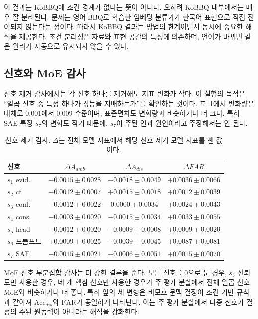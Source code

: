 \documentclass{ieeeaccess}
\newcommand{\accdis}{\mathrm{Acc}_{dis}}
\newcommand{\far}{\mathrm{FAR}}
\begin{document}
이 결과는 KoBBQ에 조건 경계가 없다는 뜻이 아니다. 오히려 KoBBQ 내부에서는 매우 잘 분리된다. 문제는 영어 BBQ로 학습한 임베딩 분류기가 한국어 표현으로 직접 전이되지 않는다는 점이다. 따라서 KoBBQ 결과는 방법의 한계이면서 동시에 중요한 해석을 제공한다. 조건 분리성은 자료와 표현 공간의 특성에 의존하며, 언어가 바뀌면 같은 원리가 자동으로 유지되지 않을 수 있다.

\subsection{신호와 MoE 감사}
신호 제거 감사에서는 각 신호 하나를 제거해도 지표 변화가 작다. 이 실험의 목적은 ``일곱 신호 중 특정 하나가 성능을 지배하는가''를 확인하는 것이다. 표~\ref{tab:signal_ko}에서 변화량은 대체로 0.001에서 0.009 수준이며, 표준편차도 변화량과 비슷하거나 더 크다. 특히 SAE 특징 $s_7$의 변화도 작기 때문에, $s_7$이 주된 인과 원인이라고 주장해서는 안 된다.

\begin{table}[t]
\caption{신호 제거 감사. $\Delta$는 전체 모델 지표에서 해당 신호 제거 모델 지표를 뺀 값이다.}
\label{tab:signal_ko}
\centering
\scriptsize
\setlength{\tabcolsep}{1.8pt}
\begin{tabular}{@{}lccc@{}}
\toprule
신호 & $\Delta A_{amb}$ & $\Delta A_{dis}$ & $\Delta FAR$ \\
\midrule
$s_1$ evid. & $-0.0015{\pm}0.0028$ & $-0.0018{\pm}0.0049$ & $+0.0036{\pm}0.0066$ \\
$s_2$ cf. & $-0.0012{\pm}0.0007$ & $+0.0015{\pm}0.0018$ & $+0.0012{\pm}0.0039$ \\
$s_3$ conf. & $-0.0012{\pm}0.0022$ & $0.0000{\pm}0.0034$ & $+0.0024{\pm}0.0043$ \\
$s_4$ cons. & $-0.0003{\pm}0.0020$ & $-0.0015{\pm}0.0034$ & $+0.0033{\pm}0.0055$ \\
$s_5$ head & $-0.0012{\pm}0.0020$ & $-0.0009{\pm}0.0008$ & $+0.0009{\pm}0.0020$ \\
$s_6$ 프롬프트 & $+0.0009{\pm}0.0025$ & $-0.0039{\pm}0.0045$ & $+0.0087{\pm}0.0081$ \\
$s_7$ SAE & $-0.0015{\pm}0.0021$ & $-0.0006{\pm}0.0051$ & $+0.0015{\pm}0.0070$ \\
\bottomrule
\end{tabular}
\end{table}

MoE 신호 부분집합 감사는 더 강한 결론을 준다. 모든 신호를 0으로 둔 경우, $s_3$ 신뢰도만 사용한 경우, 네 개 핵심 신호만 사용한 경우가 주 평가 분할에서 전체 일곱 신호 MoE와 비슷하거나 더 좋다. 특히 앞의 세 변형은 비모호 문맥 결정이 조건 기반 규칙과 같아져 $\accdis$와 $\far$가 동일하게 나타난다. 이는 주 평가 분할에서 다중 신호가 결정의 주된 원동력이 아니라는 해석을 강화한다.
\end{document}
